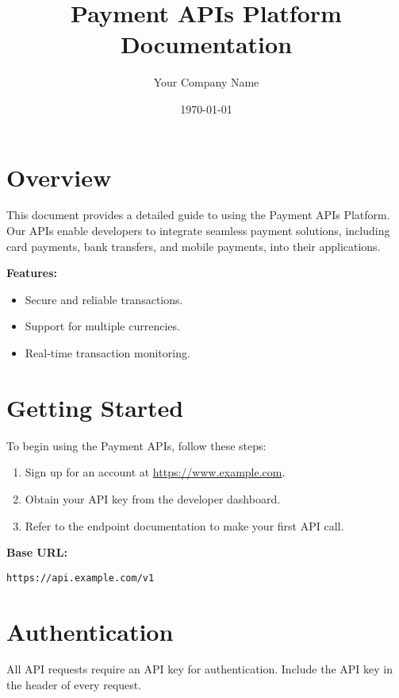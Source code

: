 \documentclass[a4paper,12pt]{article}
\begin{document}
\title{\textbf{Payment APIs Platform Documentation}}
\author{Your Company Name}
\date{\today}
\maketitle

\tableofcontents
\newpage

\section{Overview}
This document provides a detailed guide to using the Payment APIs Platform. Our APIs enable developers to integrate seamless payment solutions, including card payments, bank transfers, and mobile payments, into their applications.

\textbf{Features:}
\begin{itemize}
    \item Secure and reliable transactions.
    \item Support for multiple currencies.
    \item Real-time transaction monitoring.
\end{itemize}

\newpage

\section{Getting Started}
To begin using the Payment APIs, follow these steps:

\begin{enumerate}
    \item Sign up for an account at \href{https://www.example.com}{https://www.example.com}.
    \item Obtain your API key from the developer dashboard.
    \item Refer to the endpoint documentation to make your first API call.
\end{enumerate}

\textbf{Base URL:}
\begin{verbatim}
https://api.example.com/v1
\end{verbatim}

\newpage

\section{Authentication}
All API requests require an API key for authentication. Include the API key in the header of every request.
\end{document}
